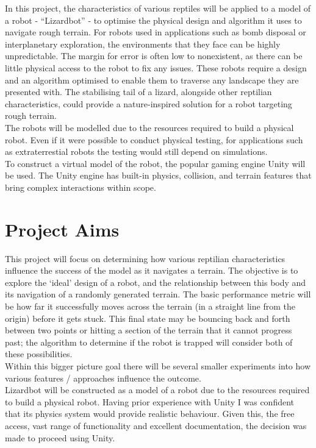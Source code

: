 \documentclass{article}
\begin{document}
In this project, the characteristics of various reptiles will be applied to a model of a robot - “Lizardbot” - to optimise the physical design and algorithm it uses to navigate rough terrain. For robots used in applications such as bomb disposal or interplanetary exploration, the environments that they face can be highly unpredictable. The margin for error is often low to nonexistent, as there can be little physical access to the robot to fix any issues. These robots require a design and an algorithm optimised to enable them to traverse any landscape they are presented with. The stabilising tail of a lizard, alongside other reptilian characteristics, could provide a nature-inspired solution for a robot targeting rough terrain.\\

The robots will be modelled due to the resources required to build a physical robot. Even if it were possible to conduct physical testing, for applications such as extraterrestial robots the testing would still depend on simulations.\\
To construct a virtual model of the robot, the popular gaming engine Unity  will be used. The Unity engine has built-in physics, collision, and terrain features that bring complex interactions within scope.


\newpage
\section{Project Aims}
\label{sec:Project Aims}
This project will focus on determining how various reptilian characteristics influence the success of the model as it navigates a terrain. The objective is to explore the ‘ideal’ design of a robot, and the relationship between this body and its navigation of a randomly generated terrain. The basic performance metric will be how far it successfully moves across the terrain (in a straight line from the origin) before it gets stuck. This final state may be bouncing back and forth between two points or hitting a section of the terrain that it cannot progress past; the algorithm to determine if the robot is trapped will consider both of these possibilities. \\
Within this bigger picture goal there will be several smaller experiments into how various features / approaches influence the outcome. \\

Lizardbot will be constructed as a model of a robot due to the resources required to build a physical robot. Having prior experience with Unity  I was confident that its physics system would provide realistic behaviour. Given this, the free access, vast range of functionality and excellent documentation, the decision was made to proceed using Unity. \\
\end{document}
